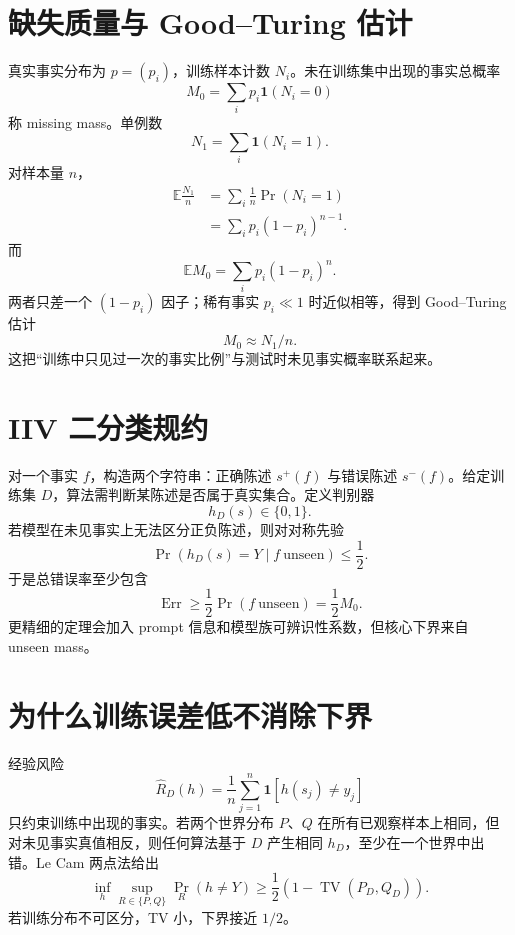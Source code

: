 \documentclass[UTF8,12pt,a4paper,fontset=none]{ctexart}
\numberwithin{equation}{section}
\newcommand{\E}{\mathbb{E}}
\begin{document}
\section{缺失质量与 Good--Turing 估计}
真实事实分布为 $p=(p_i)$，训练样本计数 $N_i$。未在训练集中出现的事实总概率
\begin{equation}
 M_0=\sum_i p_i\mathbf1(N_i=0)
\end{equation}
称 missing mass。单例数
\begin{equation}
 N_1=\sum_i\mathbf1(N_i=1).
\end{equation}
对样本量 $n$，
\begin{align}
 \E\frac{N_1}{n}
 &=\sum_i\frac1n\Pr(N_i=1)\\
 &=\sum_i p_i(1-p_i)^{n-1}.
\end{align}
而
\begin{equation}
 \E M_0=\sum_ip_i(1-p_i)^n.
\end{equation}
两者只差一个 $(1-p_i)$ 因子；稀有事实 $p_i\ll1$ 时近似相等，得到 Good--Turing 估计
\begin{equation}
 \boxed{M_0\approx N_1/n.}
\end{equation}
这把“训练中只见过一次的事实比例”与测试时未见事实概率联系起来。

\section{IIV 二分类规约}
对一个事实 $f$，构造两个字符串：正确陈述 $s^+(f)$ 与错误陈述 $s^-(f)$。给定训练集 $D$，算法需判断某陈述是否属于真实集合。定义判别器
\begin{equation}
 h_D(s)\in\{0,1\}.
\end{equation}
若模型在未见事实上无法区分正负陈述，则对对称先验
\begin{equation}
 \Pr(h_D(s)=Y\mid f\ \text{unseen})\le\frac12.
\end{equation}
于是总错误率至少包含
\begin{equation}
 \operatorname{Err}\ge\frac12\Pr(f\ \text{unseen})
 =\frac12M_0.
\end{equation}
更精细的定理会加入 prompt 信息和模型族可辨识性系数，但核心下界来自 unseen mass。

\section{为什么训练误差低不消除下界}
经验风险
\begin{equation}
 \widehat R_D(h)=\frac1n\sum_{j=1}^{n}\mathbf1[h(s_j)\ne y_j]
\end{equation}
只约束训练中出现的事实。若两个世界分布 $P$、$Q$ 在所有已观察样本上相同，但对未见事实真值相反，则任何算法基于 $D$ 产生相同 $h_D$，至少在一个世界中出错。Le Cam 两点法给出
\begin{equation}
 \inf_h\sup_{R\in\{P,Q\}}\Pr_R(h\ne Y)
 \ge\frac12(1-\operatorname{TV}(P_D,Q_D)).
\end{equation}
若训练分布不可区分，TV 小，下界接近 $1/2$。
\end{document}
